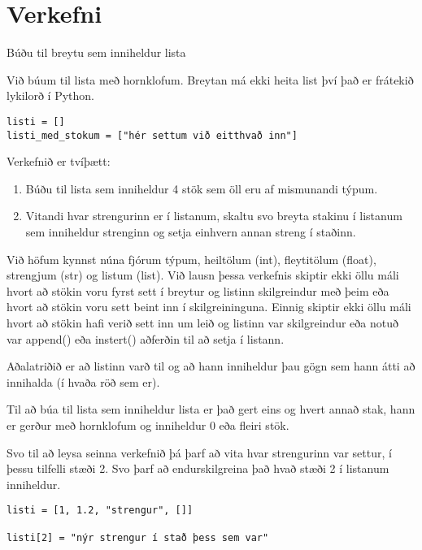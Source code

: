 \section{Verkefni}
\begin{exercise}\label{lst1}
	Búðu til breytu sem inniheldur lista
\end{exercise}
\begin{Answer}[ref={lst1}]
Við búum til lista með hornklofum.
Breytan má ekki heita list því það er frátekið lykilorð í Python.
\begin{lstlisting}
listi = []
listi_med_stokum = ["hér settum við eitthvað inn"]\end{lstlisting}
\end{Answer}

\begin{exercise}\label{lst2}
		Verkefnið er tvíþætt:
\begin{enumerate}

	\item Búðu til lista sem inniheldur 4 stök sem öll eru af mismunandi týpum.
	\item Vitandi hvar strengurinn er í listanum, skaltu svo breyta stakinu í listanum sem inniheldur strenginn og setja einhvern annan streng í staðinn.
\end{enumerate}
\end{exercise}
\begin{Answer}[ref={lst2}]
Við höfum kynnst núna fjórum týpum, heiltölum (int), fleytitölum (float), strengjum (str) og listum (list).
Við lausn þessa verkefnis skiptir ekki öllu máli hvort að stökin voru fyrst sett í breytur og listinn skilgreindur með þeim eða hvort að stökin voru sett beint inn í skilgreininguna.
Einnig skiptir ekki öllu máli hvort að stökin hafi verið sett inn um leið og listinn var skilgreindur eða notuð var append() eða instert() aðferðin til að setja í listann.

Aðalatriðið er að listinn varð til og að hann inniheldur þau gögn sem hann átti að innihalda (í hvaða röð sem er).

Til að búa til lista sem inniheldur lista er það gert eins og hvert annað stak, hann er gerður með hornklofum og inniheldur 0 eða fleiri stök.

Svo til að leysa seinna verkefnið þá þarf að vita hvar strengurinn var settur, í þessu tilfelli stæði 2.
Svo þarf að endurskilgreina það hvað stæði 2 í listanum inniheldur. 
\begin{lstlisting}
listi = [1, 1.2, "strengur", []]

listi[2] = "nýr strengur í stað þess sem var"\end{lstlisting}
\end{Answer}

